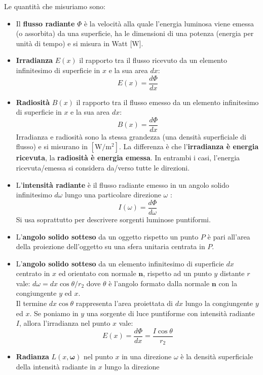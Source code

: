 \documentclass[a4paper, 10pt]{article}
\renewcommand{\vec}{\bm}
\begin{document}
		\bigskip
		
		\noindent
		Le quantità che misuriamo sono:
		\begin{itemize}
			\item Il \textbf{flusso radiante} $ \Phi $ è la velocità alla quale l’energia luminosa viene emessa (o assorbita) da una superficie, ha le dimensioni di una
			potenza (energia per unità di tempo) e si misura in Watt [W].
			\item \textbf{Irradianza} $ E(x) $ il rapporto tra il flusso ricevuto da un elemento
			infinitesimo di superficie in $ x $ e la sua area $ dx $:
			\[
				E(x) = \dfrac{d \Phi}{dx}
			\]
			\item \textbf{Radiosità} $ B(x) $ il rapporto tra il flusso emesso da un elemento
			infinitesimo di superficie in $ x $ e la sua area $ dx $:
			\[
				B(x) =\dfrac{d\Phi}{dx}
			\]
			Irradianza e radiosità sono la stessa grandezza (una densità
			superficiale di flusso) e si misurano in $ \left[ \si{\watt}/\si{\meter}^2 \right] $. La differenza è
			che l’\textbf{irradianza è energia ricevuta}, la \textbf{radiosità è energia
			emessa}. In entrambi i casi, l’energia ricevuta/emessa si considera
			da/verso tutte le direzioni.
			\item L’\textbf{intensità radiante} è il flusso radiante emesso in un angolo
			solido infinitesimo $ d\omega $ lungo una particolare direzione $ \omega $ :
			\[
				I(\omega) = \dfrac{d\Phi}{d\omega}
			\]
			Si usa soprattutto per descrivere sorgenti luminose puntiformi.\\
			\item L’\textbf{angolo solido sotteso} da un oggetto rispetto un punto $ P $ è
			pari all’area della proiezione dell’oggetto su una sfera unitaria
			centrata in $ P $.
			\item L’\textbf{angolo solido sotteso} da un elemento infinitesimo di
			superficie $ dx $ centrato in $ x $ ed orientato con normale $ \vec{n} $,
			rispetto ad un punto $ y $ distante $ r $ vale: $ d\omega = dx \cos\theta/ r_2 $
			dove $ \theta $ è l’angolo formato dalla normale $ \vec{n} $ con la congiungente
			$ y $ ed $ x $.\\
			Il termine $ dx \cos\theta $ rappresenta l’area proiettata di $ dx $ lungo la
			congiungente $ y $ ed $ x $. Se poniamo in $ y $ una sorgente di luce
			puntiforme con intensità radiante $ I $, allora l'irradianza nel punto $ x $ vale:
			\[
				E(x) = \dfrac{d\Phi}{dx} = \dfrac{I\cos\theta}{r_2}
			\]
			\item \textbf{Radianza} $ L(x,\vec{\omega}) $ nel punto $ x $ in una direzione $ \omega $ è la densità superficiale della intensità radiante in $ x $ lungo la direzione 

\end{itemize}
\end{document}
